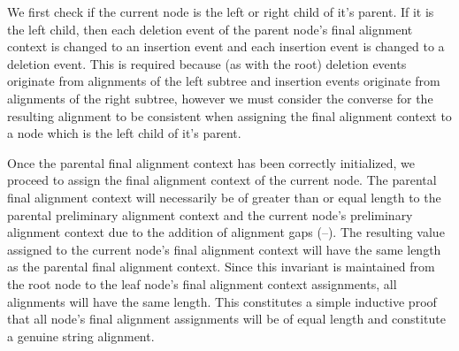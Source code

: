 \documentclass[11pt]{article}
\begin{document}
We first check if the current node is the left or right child of it's parent.
If it is the left child, then each deletion event of the parent node's final alignment context is changed to an insertion event and each insertion event is changed to a deletion event.
This is required because (as with the root) deletion events originate from alignments of the left subtree and insertion events originate from alignments of the right subtree, however we must consider the converse for the resulting alignment to be consistent when assigning the final alignment context to a node which is the left child of it's parent.

Once the parental final alignment context has been correctly initialized, we proceed to assign the final alignment context of the current node.
The parental final alignment context will necessarily be of greater than or equal length to the parental preliminary alignment context and the current node's preliminary alignment context due to the addition of alignment gaps (--).
The resulting value assigned to the current node's final alignment context will have the same length as the parental final alignment context.
Since this invariant is maintained from the root node to the leaf node's final alignment context assignments, all alignments will have the same length.
This constitutes a simple inductive proof that all node's final alignment assignments will be of equal length and constitute a genuine string alignment.
\end{document}
